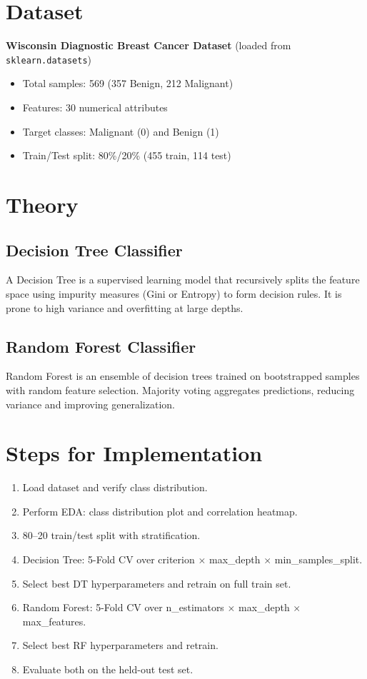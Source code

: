 \documentclass[11pt]{article}
\begin{document}
\section*{Dataset}
\textbf{Wisconsin Diagnostic Breast Cancer Dataset} (loaded from \texttt{sklearn.datasets})
\begin{itemize}
    \item Total samples: 569 (357 Benign, 212 Malignant)
    \item Features: 30 numerical attributes
    \item Target classes: Malignant (0) and Benign (1)
    \item Train/Test split: 80\%/20\% (455 train, 114 test)
\end{itemize}

\section*{Theory}

\subsection*{Decision Tree Classifier}
A Decision Tree is a supervised learning model that recursively splits the feature space using impurity measures (Gini or Entropy) to form decision rules. It is prone to high variance and overfitting at large depths.

\subsection*{Random Forest Classifier}
Random Forest is an ensemble of decision trees trained on bootstrapped samples with random feature selection. Majority voting aggregates predictions, reducing variance and improving generalization.

\section*{Steps for Implementation}
\begin{enumerate}[label=\arabic*.]
    \item Load dataset and verify class distribution.
    \item Perform EDA: class distribution plot and correlation heatmap.
    \item 80--20 train/test split with stratification.
    \item Decision Tree: 5-Fold CV over criterion $\times$ max\_depth $\times$ min\_samples\_split.
    \item Select best DT hyperparameters and retrain on full train set.
    \item Random Forest: 5-Fold CV over n\_estimators $\times$ max\_depth $\times$ max\_features.
    \item Select best RF hyperparameters and retrain.
    \item Evaluate both on the held-out test set.
\end{enumerate}
\end{document}
